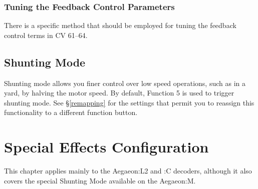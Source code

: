 \documentclass[12pt,letterpaper,draft]{memoir} %
\begin{document}
\subsection{Tuning the Feedback Control Parameters}

There is a specific method that should be employed for tuning the feedback control terms in CV 61--64.

\section{Shunting Mode}
\label{ShuntingMode}

Shunting mode allows you finer control over low speed operations, such as in a yard, by halving the motor speed. By default, Function 5 is used to trigger shunting mode. See \S\ref{remapping} for the settings that permit you to reassign this functionality to a different function button.


\chapter{Special Effects Configuration}
\label{specialeffectsconfiguration}
This chapter applies mainly to the Aegaeon:L2 and :C decoders, although it also covers the special Shunting Mode available on the Aegaeon:M.
\end{document}
